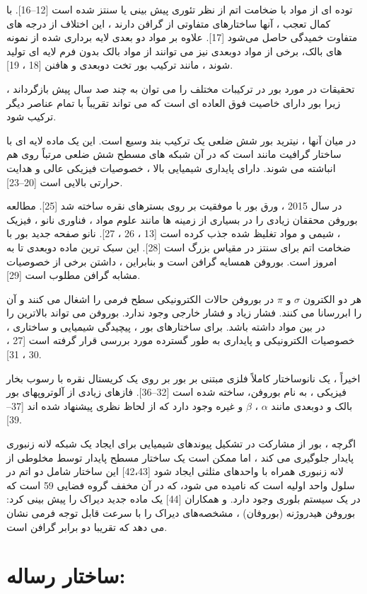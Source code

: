 توده ای از مواد با ضخامت اتم از نظر تئوری پیش بینی یا سنتز شده است [12–16]. با کمال تعجب ، آنها ساختارهای متفاوتی از گرافن دارند ، این اختلاف از درجه های متفاوت خمیدگی حاصل می‌شود [17]. علاوه بر مواد دو بعدی لایه برداری شده از نمونه های بالک، برخی از مواد دوبعدی نیز می توانند از مواد بالک بدون فرم لایه ای تولید شوند ، مانند ترکیب بور تخت دوبعدی   و هافنن [18 ، 19].

تحقیقات در مورد بور در ترکیبات مختلف را می توان به چند صد سال پیش بازگرداند ، زیرا بور دارای خاصیت فوق العاده ای است که می تواند تقریباً با تمام عناصر دیگر ترکیب شود.


در میان آنها ، نیترید بور شش ضلعی  یک ترکیب بند وسیع  است. این یک ماده لایه ای با ساختار گرافیت مانند است که در آن شبکه های مسطح شش ضلعی  مرتباً روی هم انباشته می شوند.  دارای پایداری شیمیایی بالا ، خصوصیات فیزیکی عالی و هدایت حرارتی بالایی است [20–23].

در سال 2015 ، ورق بور  با موفقیت بر روی بسترهای نقره   ساخته شد [25]. مطالعه بوروفن محققان زیادی را در بسیاری از زمینه ها مانند علوم مواد ، فناوری نانو ، فیزیک ، شیمی و مواد تغلیظ شده جذب کرده است [13 ، 26 ، 27].  نانو صفحه جدید بور با ضخامت اتم برای سنتز در مقیاس بزرگ است [28]. این سبک ترین ماده دوبعدی تا به امروز است. بوروفن همسایه گرافن است و بنابراین ، داشتن برخی از خصوصیات مشابه گرافن مطلوب است [29].

هر دو الکترون $\sigma$ و $\pi$ در بوروفن حالات الکترونیکی سطح فرمی را اشغال می کنند و آن را ابررسانا می کنند. فشار زیاد و فشار خارجی وجود ندارد. بوروفن می تواند بالاترین  را در بین مواد  داشته باشد. برای ساختارهای بور ، پیچیدگی شیمیایی و ساختاری ، خصوصیات الکترونیکی و پایداری به طور گسترده مورد بررسی قرار گرفته است [27 ، 30 ، 31].

اخیراً ، یک نانوساختار کاملاً فلزی مبتنی بر بور بر روی یک کریستال نقره با رسوب بخار فیزیکی ، به نام بوروفن، ساخته شده است [32–36]. فازهای زیادی از آلوتروپهای بور بالک و دوبعدی مانند $\alpha$ ، $\beta$ و غیره وجود دارد که از لحاظ نظری پیشنهاد شده اند [37–39]. 

اگرچه ، بور از مشارکت در تشکیل پیوندهای شیمیایی برای ایجاد یک شبکه لانه زنبوری پایدار جلوگیری می کند ، اما ممکن است یک ساختار مسطح پایدار توسط مخلوطی از لانه زنبوری همراه با واحدهای مثلثی ایجاد شود [42،43] این ساختار شامل دو اتم در سلول واحد اولیه است که  نامیده می شود، که در آن  مخفف گروه فضایی 59 است که در یک سیستم بلوری  وجود دارد.  و همکاران [44] یک ماده جدید دیراک را پیش بینی کرد: بوروفن هیدروژنه (بوروفان) ، مشخصه‌های دیراک را با سرعت قابل توجه فرمی نشان می دهد که تقریبا دو برابر گرافن است.

\section{ساختار رساله:}